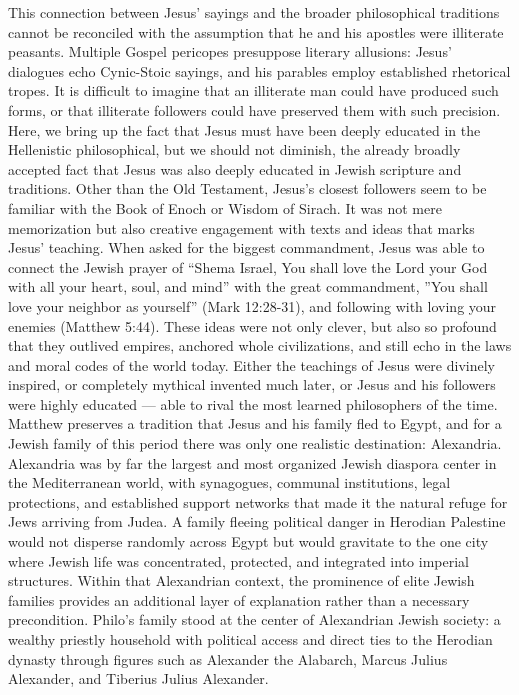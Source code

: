 This connection between Jesus’ sayings and the broader philosophical traditions cannot be reconciled with the assumption that he and his apostles were illiterate peasants.
Multiple Gospel pericopes presuppose literary allusions: Jesus’ dialogues echo Cynic-Stoic sayings, and his parables employ established rhetorical tropes.
It is difficult to imagine that an illiterate man could have produced such forms, or that illiterate followers could have preserved them with such precision.
Here, we bring up the fact that Jesus must have been deeply educated in the Hellenistic philosophical, but we should not diminish, the already broadly accepted fact that Jesus was also deeply educated in Jewish scripture and traditions.
Other than the Old Testament, Jesus's closest followers seem to be familiar with the Book of Enoch or Wisdom of Sirach.
It was not mere memorization but also creative engagement with texts and ideas that marks Jesus’ teaching.
When asked for the biggest commandment, Jesus was able to connect the Jewish prayer of ``Shema Israel, You shall love the Lord your God with all your heart, soul, and mind'' with the great commandment, ''You shall love your neighbor as yourself'' (Mark 12:28-31), and following with loving your enemies (Matthew 5:44).
These ideas were not only clever, but also so profound that they outlived empires, anchored whole civilizations, and still echo in the laws and moral codes of the world today.
Either the teachings of Jesus were divinely inspired, or completely mythical invented much later, or Jesus and his followers were highly educated --- able to rival the most learned philosophers of the time.
Matthew preserves a tradition that Jesus and his family fled to Egypt, and for a Jewish family of this period there was only one realistic destination: Alexandria.
Alexandria was by far the largest and most organized Jewish diaspora center in the Mediterranean world, with synagogues, communal institutions, legal protections, and established support networks that made it the natural refuge for Jews arriving from Judea.
A family fleeing political danger in Herodian Palestine would not disperse randomly across Egypt but would gravitate to the one city where Jewish life was concentrated, protected, and integrated into imperial structures.
Within that Alexandrian context, the prominence of elite Jewish families provides an additional layer of explanation rather than a necessary precondition.
Philo's family stood at the center of Alexandrian Jewish society: a wealthy priestly household with political access and direct ties to the Herodian dynasty through figures such as Alexander the Alabarch, Marcus Julius Alexander, and Tiberius Julius Alexander.
